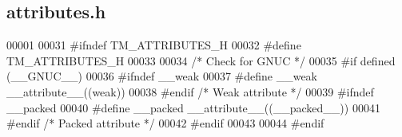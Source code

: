 \hypertarget{attributes_8h_source}{}\subsection{attributes.\+h}

\begin{DoxyCode}
00001 
00031 \textcolor{preprocessor}{#ifndef TM\_ATTRIBUTES\_H}
00032 \textcolor{preprocessor}{#define TM\_ATTRIBUTES\_H}
00033 
00034 \textcolor{comment}{/* Check for GNUC */}
00035 \textcolor{preprocessor}{#if defined (\_\_GNUC\_\_)}
00036 \textcolor{preprocessor}{    #ifndef \_\_weak      }
00037 \textcolor{preprocessor}{        #define \_\_weak      \_\_attribute\_\_((weak))}
00038 \textcolor{preprocessor}{    #endif  }\textcolor{comment}{/* Weak attribute */}\textcolor{preprocessor}{}
00039 \textcolor{preprocessor}{    #ifndef \_\_packed    }
00040 \textcolor{preprocessor}{        #define \_\_packed    \_\_attribute\_\_((\_\_packed\_\_))}
00041 \textcolor{preprocessor}{    #endif  }\textcolor{comment}{/* Packed attribute */}\textcolor{preprocessor}{}
00042 \textcolor{preprocessor}{#endif}
00043 
00044 \textcolor{preprocessor}{#endif}
\end{DoxyCode}
